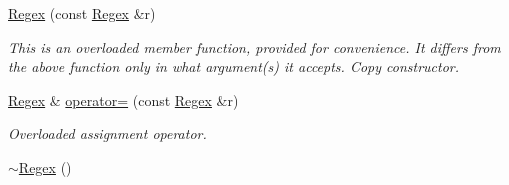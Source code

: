 \begin{DoxyCompactItemize}
\hyperlink{classjpcre2_1_1Regex_ae03bb99a5bc8f945e693ddc34706f0c0}{Regex} (const \hyperlink{classjpcre2_1_1Regex}{Regex} \&r)
\begin{DoxyCompactList}\small\item\em This is an overloaded member function, provided for convenience. It differs from the above function only in what argument(s) it accepts. Copy constructor. \end{DoxyCompactList}\item 
\hyperlink{classjpcre2_1_1Regex}{Regex} \& \hyperlink{classjpcre2_1_1Regex_ab43a14b4b6e75b7fa3221bc18a1d4121}{operator=} (const \hyperlink{classjpcre2_1_1Regex}{Regex} \&r)
\begin{DoxyCompactList}\small\item\em Overloaded assignment operator. \end{DoxyCompactList}\item 
\hyperlink{classjpcre2_1_1Regex_a12b2bf254b59d7967681b77795c49260}{$\sim$\+Regex} ()\hypertarget{classjpcre2_1_1Regex_a12b2bf254b59d7967681b77795c49260}{}\label{classjpcre2_1_1Regex_a12b2bf254b59d7967681b77795c49260}


\end{DoxyCompactItemize}
